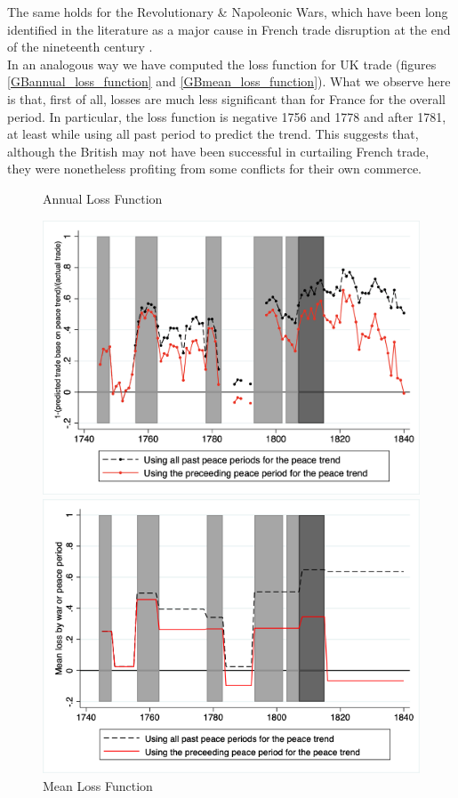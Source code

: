 \documentclass[12pt,a4paper,notitlepage,english]{article}
\begin{document}
The same holds for the Revolutionary \& Napoleonic Wars, which have been long identified in the literature as a major cause in French trade disruption at the end of the nineteenth century \citep{ORourke2006}. \\
In an analogous way we have computed the loss function for UK trade (figures \ref{GBannual_loss_function} and \ref{GBmean_loss_function}). What we observe here is that, first of all, losses are much less significant than for France for the overall period. In particular, the loss function is negative 1756 and 1778 and after 1781, at least while using all past period to predict the trend. This suggests that, although the British may not have been successful in curtailing French trade, they were nonetheless profiting from some conflicts for their own commerce. 

\begin{center}
\begin{figure}[H]
\caption{Annual Loss Function}
\label{annual_loss_function}
\centering
\includegraphics[scale=.425]{Annual_loss_function.png}
\caption{Mean Loss Function}
\label{mean_loss_function}
\includegraphics[scale=.4]{Mean_loss_function.png}
\end{figure}
\end{center}
\end{document}
